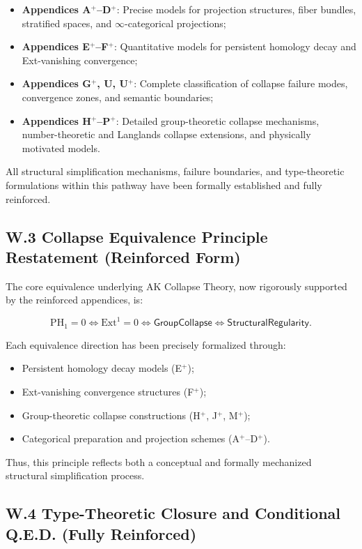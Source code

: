 \documentclass[11pt]{article}
\begin{document}
\begin{itemize}
    \item \textbf{Appendices A$^{+}$–D$^{+}$}: Precise models for projection structures, fiber bundles, stratified spaces, and $\infty$-categorical projections;
    \item \textbf{Appendices E$^{+}$–F$^{+}$}: Quantitative models for persistent homology decay and Ext-vanishing convergence;
    \item \textbf{Appendices G$^{+}$, U, U$^{+}$}: Complete classification of collapse failure modes, convergence zones, and semantic boundaries;
    \item \textbf{Appendices H$^{+}$–P$^{+}$}: Detailed group-theoretic collapse mechanisms, number-theoretic and Langlands collapse extensions, and physically motivated models.
\end{itemize}

All structural simplification mechanisms, failure boundaries, and type-theoretic formulations within this pathway have been formally established and fully reinforced.

\subsection*{W.3 Collapse Equivalence Principle Restatement (Reinforced Form)}

The core equivalence underlying AK Collapse Theory, now rigorously supported by the reinforced appendices, is:

\[
\mathrm{PH}_1 = 0 \iff \mathrm{Ext}^1 = 0 \iff \mathsf{GroupCollapse} \iff \mathsf{StructuralRegularity}.
\]

Each equivalence direction has been precisely formalized through:

\begin{itemize}
    \item Persistent homology decay models (E$^{+}$);
    \item Ext-vanishing convergence structures (F$^{+}$);
    \item Group-theoretic collapse constructions (H$^{+}$, J$^{+}$, M$^{+}$);
    \item Categorical preparation and projection schemes (A$^{+}$–D$^{+}$).
\end{itemize}

Thus, this principle reflects both a conceptual and formally mechanized structural simplification process.

\subsection*{W.4 Type-Theoretic Closure and Conditional Q.E.D. (Fully Reinforced)}
\end{document}
